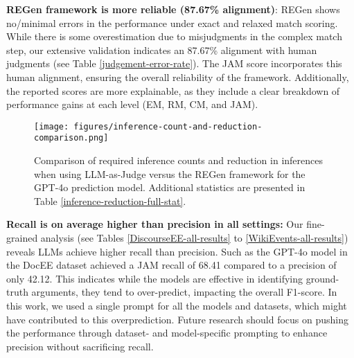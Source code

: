 \textbf{REGen framework is more reliable (87.67\% alignment)}: REGen shows no/minimal errors in the performance under exact and relaxed match scoring. While there is some overestimation due to misjudgments in the complex match step, our extensive validation indicates an 87.67\% alignment with human judgments (see Table \ref{judgement-error-rate}). The JAM score incorporates this human alignment, ensuring the overall reliability of the framework. Additionally, the reported scores are more explainable, as they include a clear breakdown of performance gains at each level (EM, RM, CM, and JAM). 


\begin{figure}[t!]
  \centering
  \texttt{[image: figures/inference-count-and-reduction-comparison.png]}
 \caption{Comparison of required inference counts and reduction in inferences when using LLM-as-Judge versus the REGen framework for the GPT-4o prediction model. Additional statistics are presented in Table \ref{inference-reduction-full-stat}.}
 \label{inference-count-and-reduction-comparison}
\end{figure}

\textbf{Recall is on average higher than precision in all settings:} Our fine-grained analysis (see Tables \ref{DiscourseEE-all-results} to \ref{WikiEvents-all-results}) reveals LLMs achieve higher recall than precision. Such as the GPT-4o model in the DocEE dataset achieved a JAM recall of 68.41 compared to a precision of only 42.12. This indicates while the models are effective in identifying ground-truth arguments, they tend to over-predict, impacting the overall F1-score. In this work, we used a single prompt for all the models and datasets, which might have contributed to this overprediction. Future research should focus on pushing the performance through dataset- and model-specific prompting to enhance precision without sacrificing recall.
